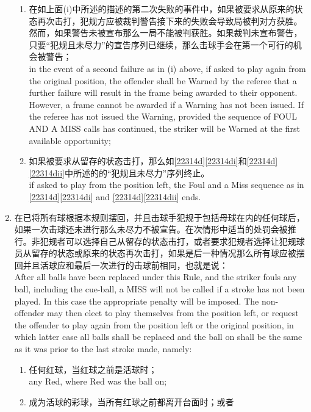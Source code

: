 \begin{enumerate}[label=(\alph*)]
\begin{enumerate}[label=(\roman*)]
        \item \label{22314dii}在如上面(i)中所述的描述的第二次失败的事件中，如果被要求从原来的状态再次击打，犯规方应被裁判警告接下来的失败会导致局被判对方获胜。然而，如果警告未被宣布那么一局不能被判获胜。如果裁判未宣布警告，只要``犯规且未尽力''的宣告序列已继续，那么击球手会在第一个可行的机会被警告；\\
        in the event of a second failure as in (i) above, if asked to play again from the original position, the offender shall be Warned by the referee that a further failure will result in the frame being awarded to their opponent. However, a frame cannot be awarded if a Warning has not been issued. If the referee has not issued the Warning, provided the sequence of FOUL AND A MISS calls has continued, the striker will be Warned at the first available opportunity;
        \item 如果被要求从留存的状态击打，那么如\ref{22314d}\ref{22314di}和\ref{22314d} \ref{22314dii}中所述的的``犯规且未尽力''序列终止。\\
        if asked to play from the position left, the Foul and a Miss sequence as in \ref{22314d}\ref{22314di} and \ref{22314d}\ref{22314dii} ends.
    \end{enumerate}
    \item \label{22314e}在已将所有球根据本规则摆回，并且击球手犯规于包括母球在内的任何球后，如果一次击球还未进行那么未尽力不被宣告。在次情形中适当的处罚会被推行。非犯规者可以选择自己从留存的状态击打，或者要求犯规者选择让犯规球员从留存的状态或原来的状态再次击打，如果是后一种情况那么所有球应被摆回并且活球应和最后一次进行的击球前相同，也就是说：\\
    After all balls have been replaced under this Rule, and the striker fouls any ball, including the cue-ball, a MISS will not be called if a stroke has not been played. In this case the appropriate penalty will be imposed. The non-offender may then elect to play themselves from the position left, or request the offender to play again from the position left or the original position, in which latter case all balls shall be replaced and the ball on shall be the same as it was prior to the last stroke made, namely:
    \begin{enumerate}[label=(\roman*)]
        \item 任何红球，当红球之前是活球时；\\
        any Red, where Red was the ball on;
        \item 成为活球的彩球，当所有红球之前都离开台面时；或者\\

\end{enumerate}
\end{enumerate}
